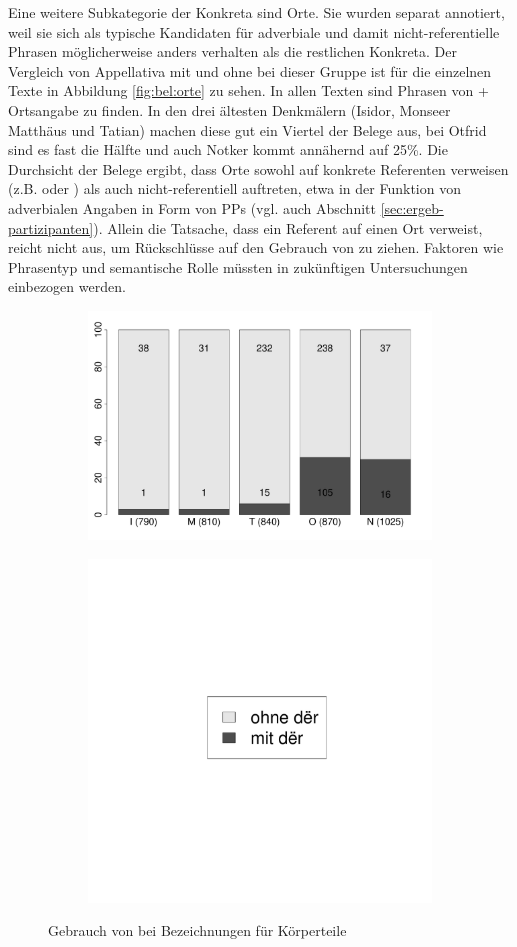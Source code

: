 Eine weitere Subkategorie der Konkreta sind Orte. Sie wurden separat annotiert, weil sie sich als typische Kandidaten für adverbiale und damit nicht-referentielle Phrasen möglicherweise anders verhalten als die restlichen Konkreta. Der Vergleich von Appellativa mit und ohne  bei dieser Gruppe ist für die einzelnen Texte in Abbildung \ref{fig:bel:orte} zu sehen. In allen Texten sind Phrasen von  + Ortsangabe zu finden. In den drei ältesten Denkmälern (Isidor, Monseer Matthäus und Tatian) machen diese gut ein Viertel der Belege aus, bei Otfrid sind es fast die Hälfte und auch Notker kommt annähernd auf 25\%. Die Durchsicht der Belege ergibt, dass Orte sowohl auf konkrete Referenten verweisen (z.B.  oder ) als auch nicht-referentiell auftreten, etwa in der Funktion von adverbialen Angaben in Form von PPs (vgl. auch Abschnitt \ref{sec:ergeb-partizipanten}).
Allein die Tatsache, dass ein Referent auf einen Ort verweist, reicht nicht aus, um Rückschlüsse auf den Gebrauch von  zu ziehen. Faktoren wie Phrasentyp und semantische Rolle müssten in zukünftigen Untersuchungen einbezogen werden.  

\begin{figure}
\begin{subfigure}[b]{.6\linewidth}
  \includegraphics[width=10 cm]{generated/images/koerper}
\end{subfigure}%
\begin{subfigure}[b]{.1\linewidth}
  \includegraphics[width=6 cm]{generated/images/ort-legende}
\end{subfigure}

\caption{Gebrauch von  bei Bezeichnungen für Körperteile}
\label{fig:bel-koerper}
\end{figure}

